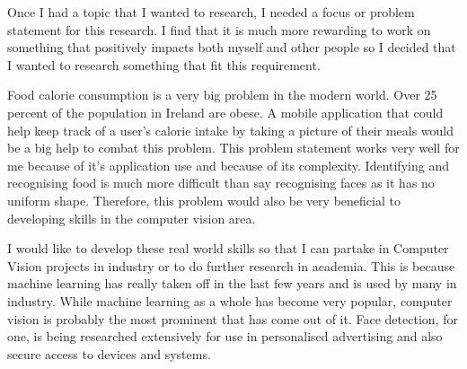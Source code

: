 Once I had a topic that I wanted to research, I needed a focus or problem statement for this research.
I find that it is much more rewarding to work on something that positively
impacts both myself and other people so I decided that I wanted to research
something that fit this requirement.

Food calorie consumption is a very big problem in the modern world.
Over 25 percent of the population in Ireland are obese.
A mobile application that could help keep track of a user's calorie intake by taking a picture of their meals would be a big help to combat this problem.
This problem statement works very well for me because of it's application use and because of its complexity.
Identifying and recognising food is much more difficult than say recognising faces as it has no uniform shape.
Therefore, this problem would also be very beneficial to developing skills in the computer vision area.

I would like to develop these real world skills so that I can partake in
Computer Vision projects in industry or to do further research in academia. This
is because machine learning has really taken off in the last few years and is
used by many in industry. While machine learning as a whole has become very
popular, computer vision is probably the most prominent that has come out of it.
Face detection, for one, is being researched extensively for use in personalised
advertising and also secure access to devices and systems.
